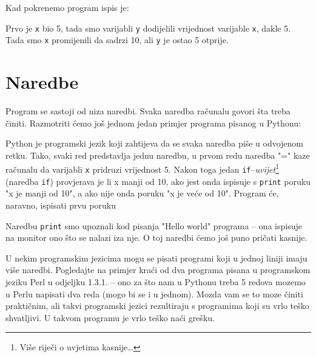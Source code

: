 	Kad pokrenemo program ispis je:


	Prvo je \verb|x| bio 5, tada smo varijabli \verb|y| dodijelili vrijednost varijable
	\verb|x|, dakle 5. Tada smo \verb|x| promijenili da sadrzi 10, ali \verb|y| je
	ostao 5 otprije.

\section{Naredbe}

	Program se sastoji od niza naredbi. Svaka naredba računalu govori šta
	treba činiti. Razmotriti ćemo još jednom jedan primjer programa
	pisanog u Pythonu:
	

	Python je programski jezik koji zahtijeva da se svaka naredba piše u odvojenom
	retku. Tako, svaki red predstavlja jednu naredbu, u prvom redu naredba "=" kaze
	računalu da varijabli \verb|x| pridruzi vrijednost 5. Nakon toga jedan
	\verb+if+--\emph{uvijet}\footnote{Više riječi o uvjetima kasnije\dots} 
	(naredba \verb+if+)
	provjerava je
	li x manji od 10, ako jest onda ispisuje s \verb+print+ poruku "x je manji od 10", a ako nije onda
	poruku "x je veće od 10". Program će, naravno, ispisati prvu poruku

	Naredbu \verb+print+ smo upoznali kod pisanja "Hello world" programa -- ona ispisuje na monitor ono što se nalazi iza nje.
	O toj naredbi ćemo još puno pričati kasnije.

	U nekim programskim jezicima mogu se pisati
	programi koji u jednoj liniji imaju više naredbi. Pogledajte na primjer kraći
	od dva programa pisana u programskom jeziku Perl u odjeljku 1.3.1. -- ono za
	što nam u Pythonu treba 5 redova mozemo u Perlu napisati dva reda (mogo bi
	se i u jednom).
	Mozda vam se to moze činiti praktičnim, ali takvi programski jezici
	rezultiraju s programima koji su vrlo teško shvatljivi. U takvom programu je
	vrlo teško naći grešku.

